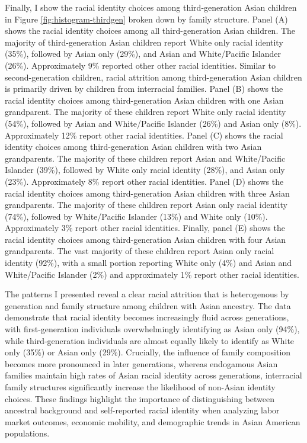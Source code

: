 Finally, I show the racial identity choices among third-generation Asian children in Figure \ref{fig:histogram-thirdgen} broken down by family structure. Panel (A) shows the racial identity choices among all third-generation Asian children. The majority of third-generation Asian children report White only racial identity (35\%), followed by Asian only (29\%), and Asian and White/Pacific Islander (26\%). Approximately 9\% reported other other racial identities. Similar to second-generation children, racial attrition among third-generation Asian children is primarily driven by children from interracial families. Panel (B) shows the racial identity choices among third-generation Asian children with one Asian grandparent. The majority of these children report White only racial identity (54\%), followed by Asian and White/Pacific Islander (26\%) and Asian only (8\%). Approximately 12\% report other racial identities. Panel (C) shows the racial identity choices among third-generation Asian children with two Asian grandparents. The majority of these children report Asian and White/Pacific Islander (39\%), followed by White only racial identity (28\%), and Asian only (23\%). Approximately 8\% report other racial identities. Panel (D) shows the racial identity choices among third-generation Asian children with three Asian grandparents. The majority of these children report Asian only racial identity (74\%), followed by White/Pacific Islander (13\%) and White only (10\%). Approximately 3\% report other racial identities. Finally, panel (E) shows the racial identity choices among third-generation Asian children with four Asian grandparents. The vast majority of these children report Asian only racial identity (92\%), with a small portion reporting White only (4\%) and Asian and White/Pacific Islander (2\%) and approximately 1\% report other racial identities.

The patterns I presented reveal a clear racial attrition that is heterogenous by generation and family structure among children with Asian ancestry. The data demonstrate that racial identity becomes increasingly fluid across generations, with first-generation individuals overwhelmingly identifying as Asian only (94\%), while third-generation individuals are almost equally likely to identify as White only (35\%) or Asian only (29\%). Crucially, the influence of family composition becomes more pronounced in later generations, whereas endogamous Asian families maintain high rates of Asian racial identity across generations, interracial family structures significantly increase the likelihood of non-Asian identity choices. These findings highlight the importance of distinguishing between ancestral background and self-reported racial identity when analyzing labor market outcomes, economic mobility, and demographic trends in Asian American populations.


